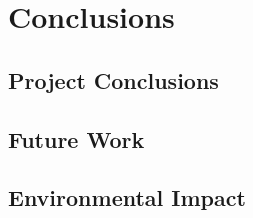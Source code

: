 \chapter{Conclusions}\label{C:Conclusions}
\section{Project Conclusions}\label{S:Project-Conclusions}
\section{Future Work}\label{S:Future-Work}
\section{Environmental Impact}\label{S:Environmental-Impact}